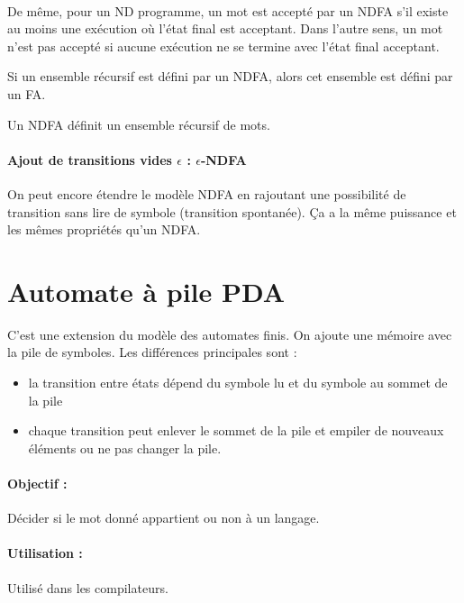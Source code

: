 \paragraph{} De même, pour un ND programme, un mot est accepté par un NDFA
s'il existe au moins une exécution où l'état final est acceptant. Dans l'autre
sens, un mot n'est pas accepté si aucune exécution ne se termine avec l'état final
acceptant.

\begin{myprop}
	Si un ensemble récursif est défini par un NDFA, alors cet ensemble est
	défini par un FA.
\end{myprop}

\begin{myprop}
	Un NDFA définit un ensemble récursif de mots.
\end{myprop}

\paragraph{Ajout de transitions vides $\epsilon$ : $\epsilon$-NDFA} On peut encore étendre le modèle NDFA en
rajoutant une possibilité de transition sans lire de symbole (transition
spontanée). Ça a la même puissance et les mêmes propriétés qu'un NDFA.


\section{Automate à pile PDA}
\label{sub:automate_pile}
C'est une extension du modèle des automates finis. On ajoute une mémoire avec
la pile de symboles.
Les différences principales sont :
\begin{itemize}
	\item la transition entre états dépend du symbole lu et du symbole au
		sommet de la pile
	\item	chaque transition peut enlever le sommet de la pile et empiler
		de nouveaux éléments ou ne pas changer la pile.
\end{itemize}

\paragraph{Objectif :} Décider si le mot donné appartient ou non à un langage.

\paragraph{Utilisation :} Utilisé dans les compilateurs.

